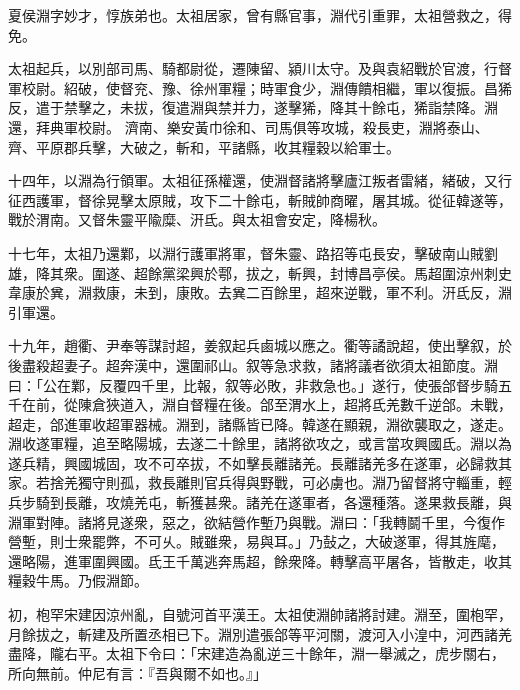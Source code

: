 \begin{pinyinscope}
 
 
 夏侯淵字妙才，惇族弟也。太祖居家，曾有縣官事，淵代引重罪，太祖營救之，得免。
 
 
 太祖起兵，以別部司馬、騎都尉從，遷陳留、潁川太守。及與袁紹戰於官渡，行督軍校尉。紹破，使督兖、豫、徐州軍糧；時軍食少，淵傳饋相繼，軍以復振。昌狶反，遣于禁擊之，未拔，復遣淵與禁并力，遂擊狶，降其十餘屯，狶詣禁降。淵還，拜典軍校尉。
 濟南、樂安黃巾徐和、司馬俱等攻城，殺長吏，淵將泰山、齊、平原郡兵擊，大破之，斬和，平諸縣，收其糧穀以給軍士。
 
 
 
 
 十四年，以淵為行領軍。太祖征孫權還，使淵督諸將擊廬江叛者雷緒，緒破，又行征西護軍，督徐晃擊太原賊，攻下二十餘屯，斬賊帥商曜，屠其城。從征韓遂等，戰於渭南。又督朱靈平隃糜、汧氐。與太祖會安定，降楊秋。
 
 
 
 
 十七年，太祖乃還鄴，以淵行護軍將軍，督朱靈、路招等屯長安，擊破南山賊劉雄，降其衆。圍遂、超餘黨梁興於鄠，拔之，斬興，封博昌亭侯。馬超圍涼州刺史韋康於兾，淵救康，未到，康敗。去兾二百餘里，超來逆戰，軍不利。汧氐反，淵引軍還。
 
 
 
 
 十九年，趙衢、尹奉等謀討超，姜叙起兵鹵城以應之。衢等譎說超，使出擊叙，於後盡殺超妻子。超奔漢中，還圍祁山。叙等急求救，諸將議者欲須太祖節度。淵曰：「公在鄴，反覆四千里，比報，叙等必敗，非救急也。」遂行，使張郃督步騎五千在前，從陳倉狹道入，淵自督糧在後。郃至渭水上，超將氐羌數千逆郃。未戰，超走，郃進軍收超軍器械。淵到，諸縣皆已降。韓遂在顯親，淵欲襲取之，遂走。淵收遂軍糧，追至略陽城，去遂二十餘里，諸將欲攻之，或言當攻興國氐。淵以為遂兵精，興國城固，攻不可卒拔，不如擊長離諸羌。長離諸羌多在遂軍，必歸救其家。若捨羌獨守則孤，救長離則官兵得與野戰，可必虜也。淵乃留督將守輜重，輕兵步騎到長離，攻燒羌屯，斬獲甚衆。諸羌在遂軍者，各還種落。遂果救長離，與淵軍對陣。諸將見遂衆，惡之，欲結營作塹乃與戰。淵曰：「我轉鬬千里，今復作營塹，則士衆罷弊，不可乆。賊雖衆，易與耳。」乃鼔之，大破遂軍，得其旌麾，還略陽，進軍圍興國。氐王千萬逃奔馬超，餘衆降。轉擊高平屠各，皆散走，收其糧穀牛馬。乃假淵節。
 
 
 
 
 初，枹罕宋建因涼州亂，自號河首平漢王。太祖使淵帥諸將討建。淵至，圍枹罕，月餘拔之，斬建及所置丞相已下。淵別遣張郃等平河關，渡河入小湟中，河西諸羌盡降，隴右平。太祖下令曰：「宋建造為亂逆三十餘年，淵一舉滅之，虎步關右，所向無前。仲尼有言：『吾與爾不如也。』」
 

\end{pinyinscope}
